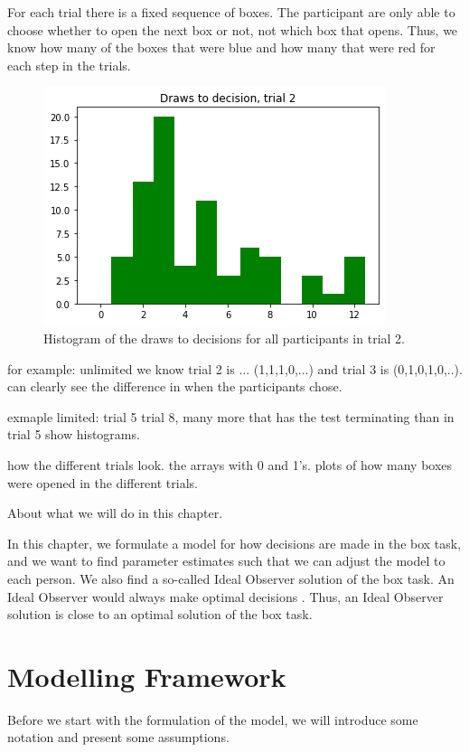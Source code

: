 For each trial there is a fixed sequence of boxes. The participant are only able to choose whether to open the next box or not, not which box that opens. Thus, we know how many of the boxes that were blue and how many that were red for each step in the trials. 



\begin{figure}
    \centering
    \includegraphics[scale=0.8]{pictures/dtd2_histogram.png}
    \caption[Draws to decisions trial 2]{Histogram of the draws to decisions for all participants in trial 2.}
    \label{fig:histogram_trial2}
\end{figure}

for example: unlimited
we know trial 2 is ... (1,1,1,0,...)
and trial 3 is (0,1,0,1,0,..). can clearly see the difference in when the participants chose. 

exmaple limited:
trial 5 
trial 8, many more that has the test terminating than in trial 5
show histograms. 



how the different trials look. the arrays with 0 and 1's. 
plots of how many boxes were opened in the different trials. 




About what we will do in this chapter. 

In this chapter, we formulate a model for how decisions are made in the box task, and we want to find parameter estimates such that we can adjust the model to each person. We also find a so-called Ideal Observer solution of the box task. An Ideal Observer would always make optimal decisions \citep{idealObs}. Thus, an Ideal Observer solution is close to an optimal solution of the box task. 



\section{Modelling Framework}
Before we start with the formulation of the model, we will introduce some notation and present some assumptions. 

